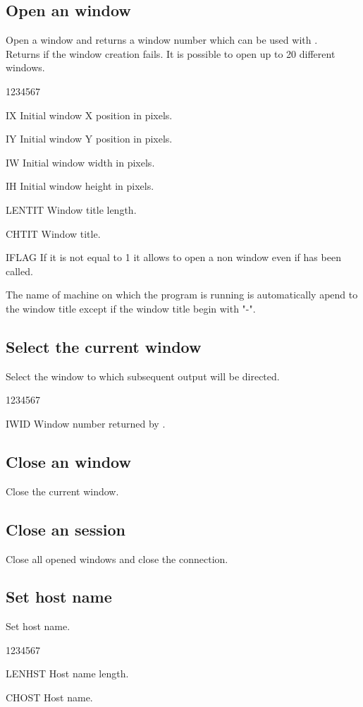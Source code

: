 \subsection{Open an  window}
\Action
Open a  window and returns a window number which can be used with
.\\
Returns  if the window creation fails. It is possible to
open up to 20 different windows.
\Pdesc
\begin{DLtt}{1234567}
\item[IX] Initial window X position in pixels.
\item[IY] Initial window Y position in pixels.
\item[IW] Initial window width in pixels.
\item[IH] Initial window height in pixels.
\item[LENTIT] Window title length.
\item[CHTIT] Window title.
\item[IFLAG] If it is not equal to 1 it allows to open a non \MOTIF{} window
             even if  has been called.
\end{DLtt}
The name of machine on which the program is running is automatically
apend to the window title except if the window title begin with "-".
\subsection{Select the current  window}
%
\Action
Select the window to which subsequent output will be directed.
\Pdesc
\begin{DLtt}{1234567}
\item[IWID] Window number returned by .
\end{DLtt}
\newpage
\subsection{Close an  window}
%
\Action
Close the current window.
\subsection{Close an  session}
%
\Action
Close all opened windows and close the  connection.
\subsection{Set  host name}
%
\Action
Set host name.
\Pdesc
\begin{DLtt}{1234567}
\item[LENHST] Host name length.
\item[CHOST] Host name.
\end{DLtt}
%
